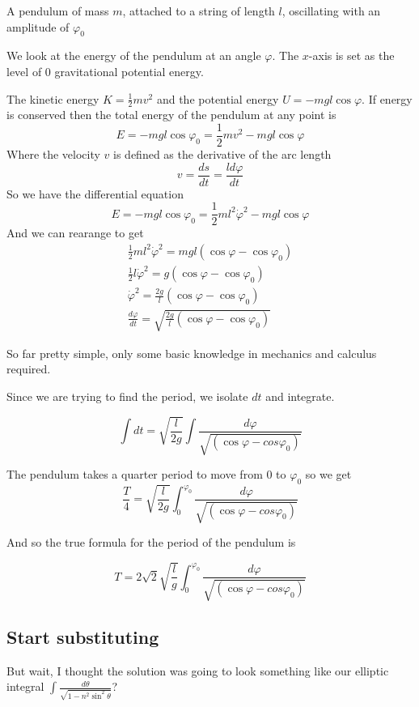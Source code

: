 \documentclass[11pt]{article}
\begin{document}
A pendulum of mass $m$, attached to a string of length $l$, oscillating with an amplitude of $\varphi_0$

\vspace{5mm} We look at the energy of the pendulum at an angle $\varphi$. The $x$-axis is set as the level of $0$ gravitational potential energy. 

\vspace{5mm}The kinetic energy $K=\frac{1}{2}mv^2$ and the potential energy $U=-mgl\cos\varphi$. If energy is conserved then the total energy of the pendulum at any point is
$$E=-mgl\cos\varphi_0=\frac{1}{2}mv^2-mgl\cos\varphi$$
Where the velocity $v$ is defined as the derivative of the arc length 
$$v=\frac{ds}{dt}=\frac{ld\varphi}{dt}$$
So we have the differential equation
$$E=-mgl\cos\varphi_0=\frac{1}{2}ml^2\dot\varphi^2-mgl\cos\varphi$$
And we can rearange to get
\begin{gather*}
\frac{1}{2}ml^2\dot\varphi^2=mgl(\cos\varphi-\cos\varphi_0) \\
\frac{1}{2}l\dot\varphi^2=g(\cos\varphi-\cos\varphi_0) \\
\dot\varphi^2=\frac{2g}{l}(\cos\varphi-\cos\varphi_0) \\
\frac{d\varphi}{dt}=\sqrt{\frac{2g}{l}(\cos\varphi-\cos\varphi_0)}
\end{gather*}

So far pretty simple, only some basic knowledge in mechanics and calculus required.

\vspace{5mm} Since we are trying to find the period, we isolate $dt$ and integrate.

$$\int dt=\sqrt{\frac{l}{2g}}\int\frac{d\varphi}{\sqrt{(\cos\varphi-cos\varphi_0)}}$$

The pendulum takes a quarter period to move from $0$ to $\varphi_0$ so we get
$$\frac{T}{4}=\sqrt{\frac{l}{2g}}\int_0^{\varphi_0}\frac{d\varphi}{\sqrt{(\cos\varphi-cos\varphi_0)}}$$

And so the true formula for the period of the pendulum is 

$$T=2\sqrt{2}\sqrt{\frac{l}{g}}\int_0^{\varphi_0}\frac{d\varphi}{\sqrt{(\cos\varphi-cos\varphi_0)}}$$

\subsection{Start substituting}

But wait, I thought the solution was going to look something like our elliptic integral
$\int\frac{d\theta}{\sqrt{1-n^2\sin^2\theta}}$?
\end{document}
